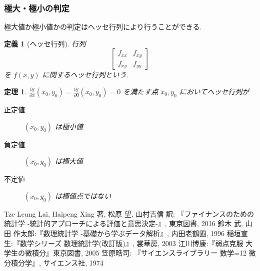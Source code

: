 \documentclass{jsarticle}
\theoremstyle{plain}
\newtheorem{theo}{定理}[section]
\newtheorem{defi}{定義}[section]
\begin{document}
  \subsubsection{極大・極小の判定}
  極大値か極小値かの判定はヘッセ行列により行うことができる.

  \begin{defi}[ヘッセ行列]
    行列
    \begin{equation*}
      \left[
        \begin{array}{ccc}
          f_{xx} & f_{xy} \\
          f_{xy} & f_{yy}
        \end{array}
      \right]
    \end{equation*}
    を $f(x, y)$ に関するヘッセ行列という.
  \end{defi}

  \begin{theo}
    $\frac{\partial f}{\partial x}(x_0, y_0) = \frac{\partial f}{\partial 0}(x_0, y_0) = 0$ を満たす点 $x_0, y_0$ においてヘッセ行列が\footnotemark
    \begin{description}
      \item[正定値] $(x_0, y_0)$ は極小値
      \item[負定値] $(x_0, y_0)$ は極大値
      \item[不定値] $(x_0, y_0)$ は極値点ではない
    \end{description}
  \end{theo}

  \begin{thebibliography}{9}
     Tze Leung Lai, Haipeng Xing 著, 松原 望, 山村吉信 訳: 『ファイナンスのための統計学 -統計的アプローチによる評価と意思決定-』, 東京図書, 2016
     鈴木 武, 山田 作太郎:『数理統計学 -基礎から学ぶデータ解析』, 内田老鶴圃, 1996
     稲垣宣生:『数学シリーズ 数理統計学(改訂版)』, 裳華房, 2003
     江川博康:『弱点克服 大学生の微積分』東京図書, 2005
     笠原晧司: 『サイエンスライブラリー 数学=12 微分積分学』, サイエンス社, 1974
  \end{thebibliography}
\end{document}
